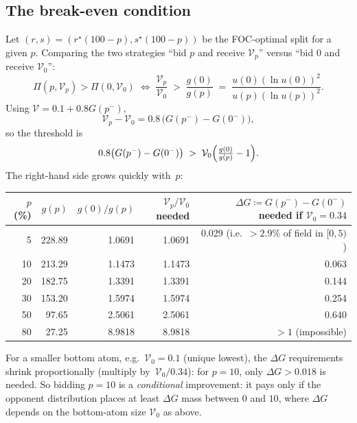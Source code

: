 \documentclass[11pt,a4paper]{article}
\theoremstyle{definition}
\theoremstyle{remark}
\newcommand{\Sp}{\mathcal{V}}
\begin{document}
\subsection{The break-even condition}

Let \((r,s)=(r^\star(100-p),s^\star(100-p))\) be the FOC-optimal split for a
given \(p\). Comparing the two strategies ``bid \(p\) and receive \(\Sp_p\)''
versus ``bid \(0\) and receive \(\Sp_0\)'':
\[
\Pi(p,\Sp_p)>\Pi(0,\Sp_0)
\;\iff\;
\frac{\Sp_p}{\Sp_0}\;>\;\frac{g(0)}{g(p)}
\;=\;\frac{u(0)(\ln u(0))^2}{u(p)(\ln u(p))^2}.
\]
Using \(\Sp=0.1+0.8 G(p^-)\),
\begin{equation}\label{eq:FBE}
\Sp_p-\Sp_0=0.8\,\bigl(G(p^{-})-G(0^{-})\bigr),
\end{equation}
so the threshold is
\begin{equation}\label{eq:thrFbe}
0.8\bigl(G(p^{-})-G(0^{-})\bigr)\;>\;\Sp_0\Bigl(\tfrac{g(0)}{g(p)}-1\Bigr).
\end{equation}
The right-hand side grows quickly with~\(p\):

\begin{center}
\renewcommand{\arraystretch}{1.10}
\begin{tabular}{r r r r r}
\toprule
\(p\) (\%) & \(g(p)\) & \(g(0)/g(p)\) & \(\Sp_p/\Sp_0\) needed & \(\Delta G\coloneqq G(p^-)-G(0^-)\) needed if \(\Sp_0=0.34\) \\
\midrule
\phantom{0}5  & 228.89 & 1.0691 & 1.0691 & 0.029 (i.e.\ \(>\!2.9\%\) of field in \([0,5)\)) \\
10            & 213.29 & 1.1473 & 1.1473 & 0.063 \\
20            & 182.75 & 1.3391 & 1.3391 & 0.144 \\
30            & 153.20 & 1.5974 & 1.5974 & 0.254 \\
50            & \phantom{0}97.65 & 2.5061 & 2.5061 & 0.640 \\
80            & \phantom{0}27.25 & 8.9818 & 8.9818 & \(>1\) (impossible) \\
\bottomrule
\end{tabular}
\end{center}

For a smaller bottom atom, e.g.\ \(\Sp_0=0.1\) (unique lowest), the
\(\Delta G\) requirements shrink proportionally (multiply by~\(\Sp_0/0.34\)):
for \(p=10\), only \(\Delta G>0.018\) is needed. So bidding \(p=10\) is a
\emph{conditional} improvement: it pays only if the opponent distribution
places at least \(\Delta G\) mass between \(0\) and \(10\), where \(\Delta G\)
depends on the bottom-atom size \(\Sp_0\) as above.
\end{document}
